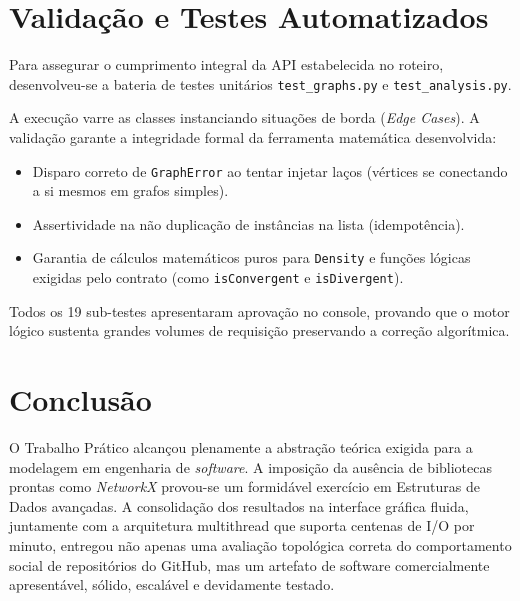 \documentclass[12pt, a4paper]{article}
\begin{document}
\section{Validação e Testes Automatizados}

Para assegurar o cumprimento integral da API estabelecida no roteiro, desenvolveu-se a bateria de testes unitários \texttt{test\_graphs.py} e \texttt{test\_analysis.py}. 

A execução varre as classes instanciando situações de borda (\textit{Edge Cases}). A validação garante a integridade formal da ferramenta matemática desenvolvida:
\begin{itemize}
    \item Disparo correto de \texttt{GraphError} ao tentar injetar laços (vértices se conectando a si mesmos em grafos simples).
    \item Assertividade na não duplicação de instâncias na lista (idempotência).
    \item Garantia de cálculos matemáticos puros para \texttt{Density} e funções lógicas exigidas pelo contrato (como \texttt{isConvergent} e \texttt{isDivergent}).
\end{itemize}

Todos os 19 sub-testes apresentaram aprovação no console, provando que o motor lógico sustenta grandes volumes de requisição preservando a correção algorítmica.

\section{Conclusão}
O Trabalho Prático alcançou plenamente a abstração teórica exigida para a modelagem em engenharia de \textit{software}. A imposição da ausência de bibliotecas prontas como \textit{NetworkX} provou-se um formidável exercício em Estruturas de Dados avançadas. A consolidação dos resultados na interface gráfica fluida, juntamente com a arquitetura multithread que suporta centenas de I/O por minuto, entregou não apenas uma avaliação topológica correta do comportamento social de repositórios do GitHub, mas um artefato de software comercialmente apresentável, sólido, escalável e devidamente testado.
\end{document}
